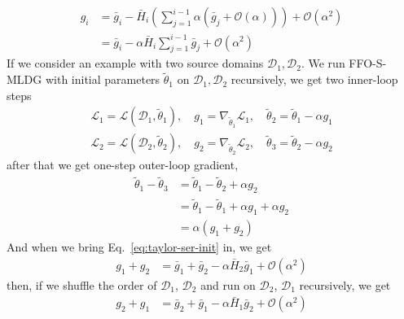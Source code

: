 \documentclass[runningheads]{llncs}
\newcommand{\nameS}{S-MLDG}
\begin{document}
\small
\begin{equation}
\label{eq:taylor-ser-init}
\begin{aligned}
g_i &= \bar{g}_i - \bar{H}_i (\sum_{j=1}^{i-1}\alpha (\bar{g}_j + \mathcal{O}(\alpha))) + \mathcal{O}(\alpha^2) \\
&=\bar{g}_i - \alpha \bar{H}_i \sum_{j=1}^{i-1} \bar{g}_j + \mathcal{O}(\alpha^2)
\end{aligned}
\end{equation}
\normalsize
If we consider an example with two source domains $\mathcal{D}_1, \mathcal{D}_2$. We run FFO-\nameS{} with initial parameters $\tilde{\theta}_1$ on $\mathcal{D}_1, \mathcal{D}_2$ recursively, we get two inner-loop steps
\small
\begin{equation}
\label{eq:reptile-grad}
\begin{aligned}
\mathcal{L}_1 = \mathcal{L}(\mathcal{D}_{1}, \tilde{\theta}_1), \quad g_1 = \nabla_{\tilde{\theta}_1}\mathcal{L}_1, \quad \tilde{\theta}_2 = \tilde{\theta}_1 - \alpha g_1 \\
\mathcal{L}_2 = \mathcal{L}(\mathcal{D}_{2}, \tilde{\theta}_2), \quad g_2 = \nabla_{\tilde{\theta}_2}\mathcal{L}_2, \quad \tilde{\theta}_3 = \tilde{\theta}_2 - \alpha g_2
\end{aligned}
\end{equation}
\normalsize
after that we get one-step outer-loop gradient,
\small
\begin{equation}
\label{eq:reptile-grad}
\begin{aligned}
\tilde{\theta}_1 - \tilde{\theta}_3 & = \tilde{\theta}_1 - \tilde{\theta}_2 + \alpha g_2 \\
&= \tilde{\theta}_1 - \tilde{\theta}_1 + \alpha g_1 + \alpha g_2 \\
&= \alpha (g_1 + g_2 )
\end{aligned}
\end{equation}
\normalsize
And when we bring Eq.~\ref{eq:taylor-ser-init} in, we get
\small
\begin{equation}
\begin{aligned}
g_1 + g_2
&= \bar{g}_1 + \bar{g}_2 - \alpha \bar{H}_2 \bar{g}_1 + \mathcal{O}(\alpha^2)
\end{aligned}
\end{equation}
\normalsize
then, if we shuffle the order of $\mathcal{D}_1$, $\mathcal{D}_2$ and run on $\mathcal{D}_2$, $\mathcal{D}_1$ recursively, we get
\small
\begin{equation}
\begin{aligned}
g_2 + g_1
&= \bar{g}_2 + \bar{g}_1 - \alpha \bar{H}_1 \bar{g}_2 + \mathcal{O}(\alpha^2)
\end{aligned}
\end{equation}
\normalsize
\end{document}
